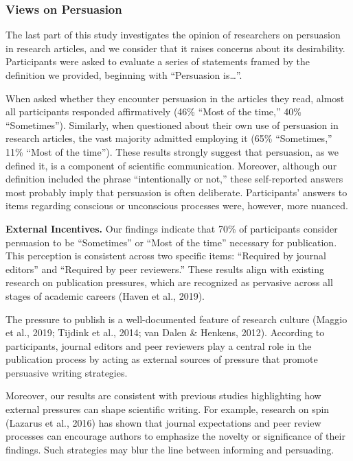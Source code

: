 \documentclass[authordate, meta]{jote-new-article}
\begin{document}
	\subsubsection{Views on Persuasion}



	The last part of this study investigates the opinion of researchers on persuasion in research articles, and we consider that it raises concerns about its desirability. Participants were asked to evaluate a series of statements framed by the definition we provided, beginning with “Persuasion is…”.



	When asked whether they encounter persuasion in the articles they read, almost all participants responded affirmatively (46\% “Most of the time,” 40\% “Sometimes”). Similarly, when questioned about their own use of persuasion in research articles, the vast majority admitted employing it (65\% “Sometimes,” 11\% “Most of the time”). These results strongly suggest that persuasion, as we defined it, is a component of scientific communication. Moreover, although our definition included the phrase “intentionally or not,” these self-reported answers most probably imply that persuasion is often deliberate. Participants' answers to items regarding conscious or unconscious processes were, however, more nuanced.



	\textbf{External Incentives.} Our findings indicate that 70\% of participants consider persuasion to be “Sometimes” or “Most of the time” necessary for publication. This perception is consistent across two specific items: “Required by journal editors” and “Required by peer reviewers.” These results align with existing research on publication pressures, which are recognized as pervasive across all stages of academic careers (Haven et al., 2019).



	The pressure to publish is a well-documented feature of research culture (Maggio et al., 2019; Tijdink et al., 2014; van Dalen \& Henkens, 2012). According to participants, journal editors and peer reviewers play a central role in the publication process by acting as external sources of pressure that promote persuasive writing strategies.



	Moreover, our results are consistent with previous studies highlighting how external pressures can shape scientific writing. For example, research on spin (Lazarus et al., 2016) has shown that journal expectations and peer review processes can encourage authors to emphasize the novelty or significance of their findings. Such strategies may blur the line between informing and persuading.
\end{document}
